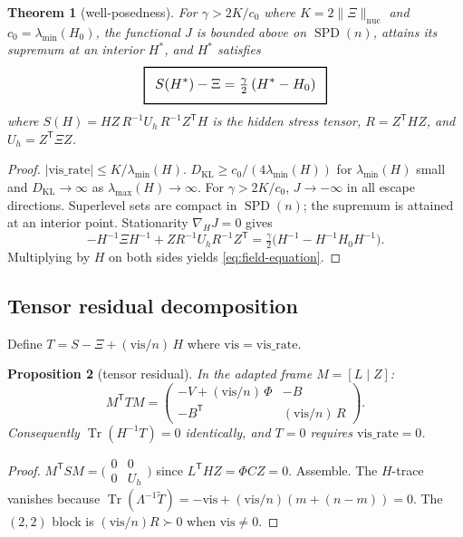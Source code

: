 \documentclass[11pt,a4paper]{article}
\numberwithin{equation}{section}
\DeclareMathOperator{\Tr}{Tr}
\newcommand{\geomboxed}[1]{%
  \setlength{\fboxsep}{8pt}%
  \setlength{\fboxrule}{0.9pt}%
  \fbox{\scalebox{1.10}{$\displaystyle #1$}}%
}
\theoremstyle{thmcompact}
\newtheorem{theorem}{Theorem}[section]
\newtheorem{proposition}[theorem]{Proposition}
\theoremstyle{remark}
\begin{document}
\begin{theorem}[well-posedness]\label{thm:kl-wellposed}
For $\gamma>2K/c_0$ where $K=2\|\Xi\|_{\mathrm{nuc}}$ and $c_0=\lambda_{\min}(H_0)$, the functional $J$ is bounded above on $\operatorname{SPD}(n)$, attains its supremum at an interior $H^*$, and $H^*$ satisfies
\begin{equation}
\geomboxed{S(H^*)-\Xi=\tfrac\gamma2\,(H^*-H_0)}
\label{eq:field-equation}
\end{equation}
where $S(H)=HZ\,R^{-1}U_h\,R^{-1}Z^{\mathsf T}H$ is the hidden stress tensor, $R=Z^{\mathsf T}HZ$, and $U_h=Z^{\mathsf T}\Xi Z$.
\end{theorem}

\begin{proof}
$|\mathrm{vis\_rate}|\le K/\lambda_{\min}(H)$.  $D_{\mathrm{KL}}\ge c_0/(4\lambda_{\min}(H))$ for $\lambda_{\min}(H)$ small and $D_{\mathrm{KL}}\to\infty$ as $\lambda_{\max}(H)\to\infty$.  For $\gamma>2K/c_0$, $J\to-\infty$ in all escape directions.  Superlevel sets are compact in $\operatorname{SPD}(n)$; the supremum is attained at an interior point.  Stationarity $\nabla_H J=0$ gives
\[
-H^{-1}\Xi H^{-1}+ZR^{-1}U_hR^{-1}Z^{\mathsf T}
=\tfrac\gamma2\bigl(H^{-1}-H^{-1}H_0 H^{-1}\bigr).
\]
Multiplying by $H$ on both sides yields \eqref{eq:field-equation}.
\end{proof}

\subsection*{Tensor residual decomposition}

Define $T=S-\Xi+(\mathrm{vis}/n)\,H$ where $\mathrm{vis}=\mathrm{vis\_rate}$.

\begin{proposition}[tensor residual]\label{prop:tensor-residual}
In the adapted frame $M=[L\mid Z]$:
\[
M^{\mathsf T}TM
=\begin{pmatrix}
-V+(\mathrm{vis}/n)\,\Phi & -B \\
-B^{\mathsf T} & (\mathrm{vis}/n)\,R
\end{pmatrix}.
\]
Consequently $\Tr(H^{-1}T)=0$ identically, and $T=0$ requires $\mathrm{vis\_rate}=0$.
\end{proposition}

\begin{proof}
$M^{\mathsf T}SM=\bigl(\begin{smallmatrix}0&0\\0&U_h\end{smallmatrix}\bigr)$ since $L^{\mathsf T}HZ=\Phi CZ=0$.  Assemble.  The $H$-trace vanishes because $\Tr(\Lambda^{-1}\tilde T)=-\mathrm{vis}+(\mathrm{vis}/n)(m+(n{-}m))=0$.  The $(2{,}2)$ block is $(\mathrm{vis}/n)R\succ 0$ when $\mathrm{vis}\ne 0$.
\end{proof}
\end{document}
